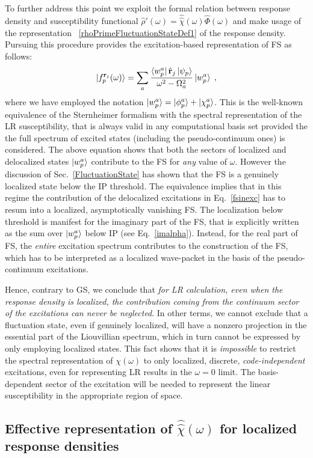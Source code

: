 \documentclass[reprint,aps,prb]{revtex4-1}
\newcommand{\be}{\begin{equation}}
\newcommand{\ee}{\end{equation}}
\newcommand{\lb}{\label}
\newcommand{\op}[1]{\hat {#1}}
\newcommand{\sop}[1]{\op{\op {#1}}}
\newcommand{\dm}{\op{\rho}}
\begin{document}
To further address this point we exploit the formal relation between response density and susceptibility functional $\dm'(\omega) = \sop \chi(\omega)\op\Phi(\omega)$ and make usage of the representation ~\eqref{rhoPrimeFluctuationStateDef1} of the response density.
Pursuing this procedure provides the excitation-based representation of FS as follows:
\be\lb{fsinexc}
\ket{f_p^{\mathbf r_j}(\omega)}=
\sum_a \frac{\bra{w_p^a} \op{\mathbf r}_j \ket{\psi_p}}{\omega^2 - \Omega_a^2}
\ket{w_p^a}\;,
\ee
where we have employed the notation $\ket{w_p^a}=\ket{\phi_p^a}+\ket{\chi_p^a}$.
This is the well-known equivalence of the Sternheimer formalism with the spectral representation of the LR susceptibility, that is always valid
in any computational basis set provided the the full spectrum of excited states (including the pseudo-continuum ones) is considered.
The above equation shows that both the sectors of localized and delocalized states $\ket{w_p^a}$ contribute to the FS for \emph{any} value of $\omega$.
However the discussion of Sec.~\ref{FluctuationState} has shown that the FS is a genuinely localized state below the IP threshold.
The equivalence implies that in this regime the contribution of the delocalized excitations in Eq.~\eqref{fsinexc} has to resum into a localized, asymptotically vanishing FS.
The localization below threshold is manifest for the imaginary part of the FS, that is explicitly written as the sum over $\ket{w_p^a}$ below IP (see Eq.~\eqref{imalpha}).
Instead, for the real part of FS, the \emph{entire} excitation spectrum contributes to the construction of the FS,
which has to be interpreted as a localized wave-packet in the basis of the pseudo-continuum excitations.

Hence, contrary to GS, we conclude that \emph{for LR calculation, even when the response density is localized, the contribution coming from the
continuum sector of the excitations can never be neglected}. In other terms, we cannot exclude that a fluctuation state, even if genuinely localized, will have a nonzero projection in the essential part of the Liouvillian spectrum, which in turn cannot be expressed by only employing localized states.
This fact shows that it is \emph{impossible} to restrict the spectral representation of $\chi(\omega)$ to only localized, discrete, \emph{code-independent} excitations, even for representing LR results in the $\omega=0$ limit. The basis-dependent sector of the excitation will be needed to
represent the linear susceptibility in the appropriate region of space.

\subsection{Effective representation of $\sop \chi(\omega)$ for localized response densities}
\end{document}
